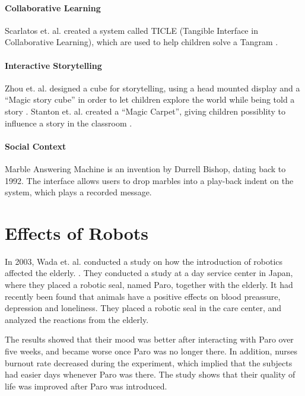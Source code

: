 \paragraph{Collaborative Learning}
Scarlatos et. al. created a system called TICLE (Tangible Interface in Collaborative Learning), which are used to help children solve a Tangram \cite{scarlatos1999ticle}.  

\paragraph{Interactive Storytelling}
Zhou et. al. designed a cube for storytelling, using a head mounted display and a ``Magic story cube'' in order to let children explore the world while being told a story \cite{zhou2004magic}. Stanton et. al. created a ``Magic Carpet'', giving children possiblity to influence a story in the classroom \cite{stanton2001classroom}. 
 
\paragraph{Social Context}
Marble Answering Machine is an invention by Durrell Bishop, dating back to 1992\cite{crampton1995hand}. The interface allows users to drop marbles into a play-back indent on the system, which plays a recorded message.   

\section{Effects of Robots}

In 2003, Wada et. al. conducted a study on how the introduction of robotics affected the elderly. \cite{wada2004effects}. They conducted a study at a day service center in Japan, where they placed a robotic seal, named Paro, together with the elderly. It had recently been found that animals have a positive effects on blood preassure, depression and loneliness. They placed a robotic seal in the care center, and analyzed the reactions from the elderly. 

The results showed that their mood was better after interacting with Paro over five weeks, and became worse once Paro was no longer there. In addition, nurses burnout rate decreased during the experiment, which implied that the subjects had easier days whenever Paro was there. The study shows that their quality of life was improved after Paro was introduced.           


